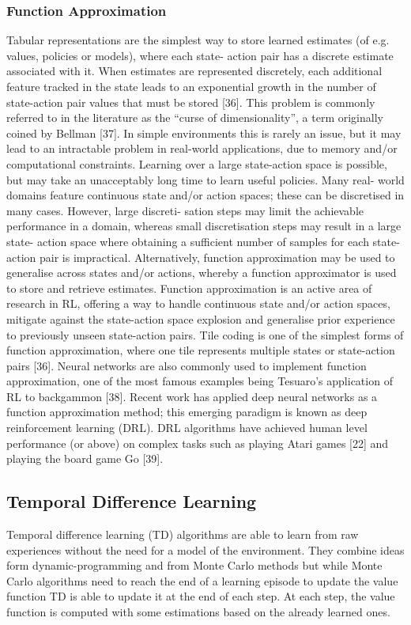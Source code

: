 \subsubsection{Function Approximation}
Tabular representations are the simplest way to store learned
estimates (of e.g. values, policies or models), where each state-
action pair has a discrete estimate associated with it. When
estimates are represented discretely, each additional feature
tracked in the state leads to an exponential growth in the
number of state-action pair values that must be stored [36].
This problem is commonly referred to in the literature as the
“curse of dimensionality”, a term originally coined by Bellman
[37]. In simple environments this is rarely an issue, but it
may lead to an intractable problem in real-world applications,
due to memory and/or computational constraints. Learning
over a large state-action space is possible, but may take an
unacceptably long time to learn useful policies. Many real-
world domains feature continuous state and/or action spaces;
these can be discretised in many cases. However, large discreti-
sation steps may limit the achievable performance in a domain,
whereas small discretisation steps may result in a large state-
action space where obtaining a sufficient number of samples
for each state-action pair is impractical. Alternatively, function
approximation may be used to generalise across states and/or
actions, whereby a function approximator is used to store and
retrieve estimates. Function approximation is an active area
of research in RL, offering a way to handle continuous state
and/or action spaces, mitigate against the state-action space
explosion and generalise prior experience to previously unseen
state-action pairs. Tile coding is one of the simplest forms
of function approximation, where one tile represents multiple
states or state-action pairs [36]. Neural networks are also
commonly used to implement function approximation, one of
the most famous examples being Tesuaro’s application of RL
to backgammon [38]. Recent work has applied deep neural
networks as a function approximation method; this emerging
paradigm is known as deep reinforcement learning (DRL).
DRL algorithms have achieved human level performance (or
above) on complex tasks such as playing Atari games [22] and
playing the board game Go [39].


\subsection{Temporal Difference Learning}
Temporal difference learning (TD) \cite{irl} algorithms are able to learn from raw experiences without the need for a model of the environment. They combine ideas form dynamic-programming and from Monte Carlo methods but while Monte Carlo algorithms need to reach the end of a learning episode to update the value function TD is able to update it at the end of each step.
At each step, the value function is computed with some estimations based on the already learned ones.

